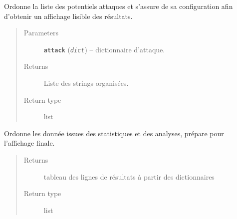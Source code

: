 \documentclass[letterpaper,10pt,english]{sphinxmanual}
\begin{document}
\begin{fulllineitems}
\begin{fulllineitems}
\begin{quote}
\begin{description}
\end{description}\end{quote}

\end{fulllineitems}


\begin{fulllineitems}
\label{loganalyser:loganalyser.diagnostique.Diagnostique.get_attack}
Ordonne la liste des potentiels attaques et s'assure de sa configuration afin d'obtenir un affichage lisible
des résultats.
\begin{quote}\begin{description}
\item[{Parameters}] \leavevmode
\textbf{\texttt{attack}} (\emph{\texttt{dict}}) -- dictionnaire d'attaque.

\item[{Returns}] \leavevmode
Liste des strings organisées.

\item[{Return type}] \leavevmode
list

\end{description}\end{quote}

\end{fulllineitems}


\begin{fulllineitems}
\label{loganalyser:loganalyser.diagnostique.Diagnostique.get_report}
Ordonne les donnée issues des statistiques et des analyses, prépare pour l'affichage finale.
\begin{quote}\begin{description}
\item[{Returns}] \leavevmode
tableau des lignes de résultats à partir des dictionnaires

\item[{Return type}] \leavevmode
list

\end{description}\end{quote}

\end{fulllineitems}



\end{fulllineitems}
\end{document}
